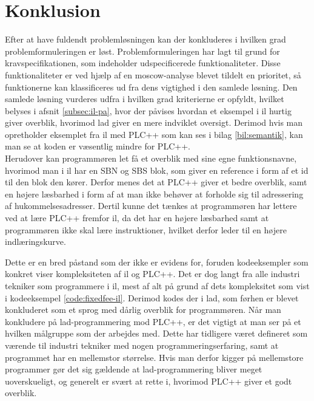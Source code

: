 \chapter{Konklusion}
\label{sec:konklusion}

Efter at have fuldendt problemløsningen kan der konkluderes i hvilken grad problemformuleringen er løst.
Problemformuleringen har lagt til grund for kravspecifikationen, som indeholder udspecificerede funktionaliteter.
Disse funktionaliteter er ved hjælp af en \gls{moscow}-analyse blevet tildelt en prioritet, så funktionerne kan klassificeres ud fra dens vigtighed i den samlede løsning.
Den samlede løsning vurderes udfra i hvilken grad kriterierne er opfyldt, hvilket belyses i afsnit \ref{subsec:il-pa}, hvor der påvises hvordan et eksempel i \gls{il} hurtig giver overblik, hvorimod \gls{lad} giver en mere indviklet oversigt. Derimod hvis man opretholder eksemplet fra \gls{il} med PLC++ som kan ses i bilag \ref{bil:semantik}, kan man se at koden er væsentlig mindre for PLC++.\\

\noindent Herudover kan programmøren let få et overblik med sine egne funktionsnavne, hvorimod man i \gls{il} har en SBN og SBS blok, som giver en reference i form af et id til den blok den kører.
Derfor menes det at PLC++ giver et bedre overblik, samt en højere læsbarhed i form af at man ikke behøver at forholde sig til adressering af hukommelsesadresser.
Dertil kunne det tænkes at programmøren har lettere ved at lære PLC++ fremfor \gls{il}, da det har en højere  læsbarhed samt at programmøren ikke skal lære instruktioner, hvilket derfor leder til en højere indlæringskurve. 

Dette er en bred påstand som der ikke er evidens for, foruden kodeeksempler som konkret viser kompleksiteten af \gls{il} og PLC++.
Det er dog langt fra alle industri tekniker som programmere i \gls{il}, mest af alt på grund af dets kompleksitet som vist i kodeeksempel \ref{code:fixedfee-il}.
Derimod kodes der i \gls{lad}, som førhen er blevet konkluderet som et sprog med dårlig overblik for programmøren.
Når man konkludere på \gls{lad}-programmering mod PLC++, er det vigtigt at man ser på et hvilken målgruppe som der arbejdes med.
Dette har tidligere været defineret som værende til industri tekniker med nogen programmeringserfaring, samt at programmet har en mellemstor størrelse.
Hvis man derfor kigger på mellemstore programmer gør det sig gældende at \gls{lad}-programmering bliver meget uoverskueligt, og generelt er svært at rette i, hvorimod PLC++ giver et godt overblik.\\

